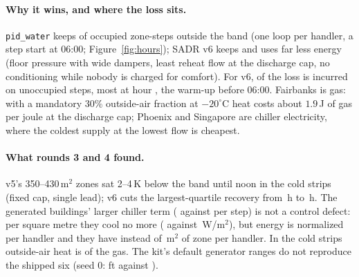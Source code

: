 \documentclass{article}
\begin{document}
\paragraph{Why it wins, and where the loss sits.}
\texttt{pid\_water} keeps \OccOutPidWater{} of occupied zone-steps outside the band (one loop per handler,
a step start at 06:00; Figure~\ref{fig:hours}); SADR v6 keeps \OccOutOurs{} and uses far less energy
(floor pressure with wide dampers, least reheat flow at the discharge cap, no conditioning while nobody
is charged for comfort). For v6, \UnoccShareOurs{} of the loss is incurred on unoccupied steps, most at
hour \PeakLossHourOurs{}, the warm-up before 06:00. Fairbanks is gas: with a mandatory 30\% outside-air
fraction at $-20^\circ$C heat costs about $1.9$\,J of gas per joule at the discharge cap; Phoenix and
Singapore are chiller electricity, where the coldest supply at the lowest flow is cheapest.

\paragraph{What rounds 3 and 4 found.}
v5's 350--430\,m$^2$ zones sat 2--4\,K below the band until noon in the cold strips (fixed cap, single lead);
v6 cuts the largest-quartile recovery from \DecHeldRVFiveRecoveryBig\,h to \DecHeldROursRecoveryBig\,h. The
generated buildings' larger chiller term (\DecHeldROursCooling{} against \DecPubOursCooling{} per step) is
not a control defect: per square metre they cool no more (\RFCoolWmRThree{} against \RFCoolWmPub\,W/m$^2$),
but energy is normalized per handler and they have \RFAreaPerAhuRThree{} instead of \RFAreaPerAhuPub\,m$^2$
of zone per handler. In the cold strips outside-air heat is \RFVentGasPub{} of the gas. The kit's default
generator ranges do not reproduce the shipped six (seed 0: \RFSeedZeroDefaultSize{} ft against
\RFTrainOneSize).
\end{document}
